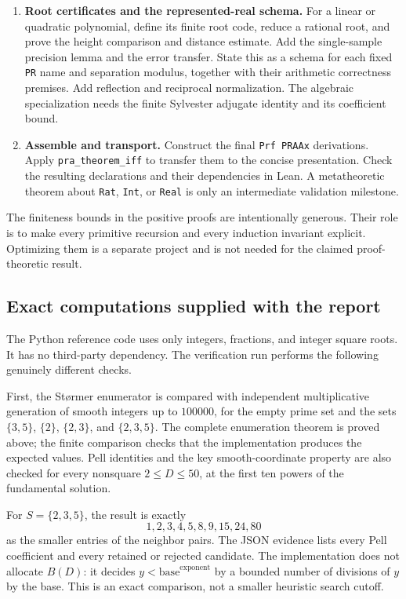 \begin{enumerate}
\item \textbf{Root certificates and the represented-real schema.}
For a linear or quadratic polynomial, define its finite root code, reduce a
rational root, and prove the height comparison and distance estimate.  Add
the single-sample precision lemma and the error transfer.  State this as a
schema for each fixed \texttt{PR} name and separation modulus, together with
their arithmetic correctness premises.  Add reflection and reciprocal
normalization.  The algebraic specialization needs the finite Sylvester
adjugate identity and its coefficient bound.

\item \textbf{Assemble and transport.}
Construct the final \texttt{Prf PRAAx} derivations.  Apply
\texttt{pra\_theorem\_iff} to transfer them to the concise presentation.
Check the resulting declarations and their dependencies in Lean.  A
metatheoretic theorem about \texttt{Rat}, \texttt{Int}, or \texttt{Real} is
only an intermediate validation milestone.
\end{enumerate}

The finiteness bounds in the positive proofs are intentionally generous.
Their role is to make every primitive recursion and every induction invariant
explicit.  Optimizing them is a separate project and is not needed for the
claimed proof-theoretic result.

\subsection{Exact computations supplied with the report}

The Python reference code uses only integers, fractions, and integer square
roots.  It has no third-party dependency.  The verification run performs the
following genuinely different checks.

First, the St\o rmer enumerator is compared with independent multiplicative
generation of smooth integers up to $100000$, for the empty prime set and
the sets $\{3,5\}$, $\{2\}$, $\{2,3\}$, and $\{2,3,5\}$.  The complete
enumeration theorem is proved above; the finite comparison checks that the
implementation produces the expected values.  Pell identities and the key
smooth-coordinate property are also checked for every nonsquare
$2\leq D\leq50$, at the first ten powers of the fundamental solution.

For $S=\{2,3,5\}$, the result is exactly
\[
 1,2,3,4,5,8,9,15,24,80
\]
as the smaller entries of the neighbor pairs.  The JSON evidence lists every
Pell coefficient and every retained or rejected candidate.  The implementation
does not allocate $B(D)$: it decides $y<\mathrm{base}^{\mathrm{exponent}}$
by a bounded number of divisions of $y$ by the base.  This is an exact
comparison, not a smaller heuristic search cutoff.

